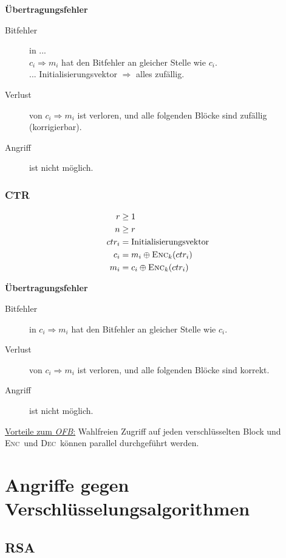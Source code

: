 \documentclass[a4paper,landscape]{article}
\newcommand{\plaint}{\ensuremath{m}}
\newcommand{\ciphert}{\ensuremath{c}}
\newcommand{\enc}{\textsc{Enc}}
\newcommand{\dec}{\textsc{Dec}}
\begin{document}
\begin{multicols*}{4}
	\textbf{Übertragungsfehler}
	\begin{description}
		\item[Bitfehler] in ... \\
		      \(\ciphert_{i} \Rightarrow \plaint_{i}\) hat den
		      Bitfehler an gleicher Stelle wie \(\ciphert_{i}\). \\
		      ... Initialisierungsvektor \(\Rightarrow\) alles zufällig.
		\item[Verlust] von \(\ciphert_{i} \Rightarrow \plaint_{i}\) ist verloren,
		      und alle folgenden Blöcke sind zufällig (korrigierbar).
		\item[Angriff] ist nicht möglich.
	\end{description}

	\subsubsection{CTR}
	\begin{align*}
		r            & \geq 1                                  \\
		n            & \geq r                                  \\
		ctr_{i}      & =  \text{Initialisierungsvektor}        \\
		\ciphert_{i} & = \plaint_{i} \oplus \enc_{k}(ctr_{i})  \\
		\plaint_{i}  & = \ciphert_{i} \oplus \enc_{k}(ctr_{i})
	\end{align*}

	\textbf{Übertragungsfehler}
	\begin{description}
		\item[Bitfehler] in \(\ciphert_{i} \Rightarrow \plaint_{i}\) hat den
		      Bitfehler an gleicher Stelle wie \(\ciphert_{i}\).
		\item[Verlust] von \(\ciphert_{i} \Rightarrow \plaint_{i}\) ist verloren,
		      und alle folgenden Blöcke sind korrekt.
		\item[Angriff] ist nicht möglich.
	\end{description}
	\underline{Vorteile zum \emph{OFB}:} Wahlfreien Zugriff auf jeden
	verschlüsselten Block und \enc\ und \dec\ können parallel durchgeführt
	werden.

	\section{Angriffe gegen Verschlüsselungsalgorithmen}
	\subsection{RSA}

\end{multicols*}
\end{document}

